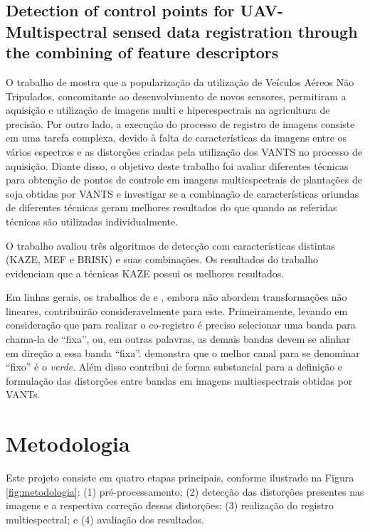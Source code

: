 \documentclass[12pt]{article}
\begin{document}
\subsection{Detection of control points for UAV-Multispectral sensed data registration through the combining of feature descriptors}

O trabalho de \cite{junior2019detection} mostra que a popularização da utilização de Veículos Aéreos Não Tripulados, concomitante ao desenvolvimento de novos sensores, permitiram a aquisição e utilização de imagens multi e hiperespectrais na agricultura de precisão. Por outro lado, a execução do processo de registro de imagens consiste em uma tarefa complexa, devido à falta de características da imagens entre os vários espectros e as distorções criadas pela utilização dos VANTS no processo de aquisição. Diante disso, o objetivo deste trabalho foi avaliar diferentes técnicas para obtenção de pontos de controle em imagens multiespectrais de plantações de soja obtidas por VANTS e investigar se a combinação de características oriundas de diferentes técnicas geram melhores resultados do que quando as referidas técnicas são utilizadas individualmente. 

O trabalho avaliou três algoritmos de detecção com características distintas (KAZE, MEF e BRISK) e suas combinações. Os resultados do trabalho evidenciam que a técnicas KAZE possui os melhores resultados.

Em linhas gerais, os trabalhos de \cite{junior2019detection} e \cite{dias2020uav}, embora não abordem transformações não lineares, contribuirão consideravelmente para este. Primeiramente, levando em consideração que para realizar o co-registro é preciso selecionar uma banda para chama-la de ``fixa'', ou, em outras palavras, as demais bandas devem se alinhar em direção a essa banda ``fixa''. \cite{dias2020uav} demonstra que o melhor canal para se denominar ``fixo'' é o \textit{verde}. Além disso \cite{junior2019detection, dias2020uav} contribui de forma substancial para a definição e formulação das distorções entre bandas em imagens multiespectrais obtidas por VANTs.



\section{Metodologia} 
\label{sec:metodologia}

Este projeto consiste em quatro etapas principais, conforme ilustrado na Figura \ref{fig:metodologia}: (1) pré-processamento; (2) detecção das distorções presentes nas imagens e a respectiva correção dessas distorções; (3) realização do registro multiespectral; e (4) avaliação dos resultados.
\end{document}
